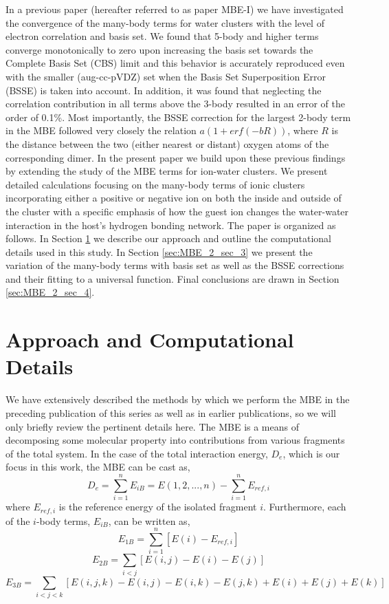 \documentclass[11pt, proquest]{uwthesis}[2020/02/24]
\begin{document}
\par In a previous paper\autocite{heindel_many-body_2020} (hereafter referred to as paper MBE-I) we have investigated the convergence of the many-body terms for water clusters with the level of electron correlation and basis set. We found that 5-body and higher terms converge monotonically to zero upon increasing the basis set towards the Complete Basis Set (CBS) limit and this behavior is accurately reproduced even with the smaller (aug-cc-pVDZ) set when the Basis Set Superposition Error (BSSE) is taken into account. In addition, it was found that neglecting the correlation contribution in all terms above the 3-body resulted in an error of the order of 0.1\%. Most importantly, the BSSE correction for the largest 2-body term in the MBE followed very closely the relation $a(1+erf(-bR))$, where $R$ is the distance between the two (either nearest or distant) oxygen atoms of the corresponding dimer. In the present paper we build upon these previous findings by extending the study of the MBE terms for ion-water clusters. We present detailed calculations focusing on the many-body terms of ionic clusters incorporating either a positive or negative ion on both the inside and outside of the cluster with a specific emphasis of how the guest ion changes the water-water interaction in the host’s hydrogen bonding network. The paper is organized as follows. In Section \ref{sec:MBE_2_sec_2} we describe our approach and outline the computational details used in this study. In Section \ref{sec:MBE_2_sec_3} we present the variation of the many-body terms with basis set as well as the BSSE corrections and their fitting to a universal function. Final conclusions are drawn in Section \ref{sec:MBE_2_sec_4}.

\section{Approach and Computational Details} \label{sec:MBE_2_sec_2}
\par We have extensively described the methods by which we perform the MBE in the preceding publication of this series\autocite{heindel_many-body_2020} as well as in earlier publications,\autocite{xantheas_ab_1994,xantheas_cooperativity_2000} so we will only briefly review the pertinent details here. The MBE is a means of decomposing some molecular property into contributions from various fragments of the total system. In the case of the total interaction energy, $D_e$, which is our focus in this work, the MBE can be cast as,\autocite{xantheas_ab_1994,xantheas_cooperativity_2000,hankins_water_1970}
$$
D_e=\sum_{i=1}^nE_{iB}=E(1,2,...,n)-\sum_{i=1}^nE_{ref,i}
$$
where $E_{ref,i}$ is the reference energy of the isolated fragment $i$. Furthermore, each of the $i$-body terms, $E_{iB}$, can be written as,
$$
E_{1B}=\sum_{i=1}^n[E(i)-E_{ref,i}]
$$
$$
E_{2B}=\sum_{i<j}[E(i,j)-E(i)-E(j)]
$$
$$
E_{3B}=\sum_{i<j<k}[E(i,j,k)-E(i,j)-E(i,k)-E(j,k)+E(i)+E(j)+E(k)]
$$
\end{document}
